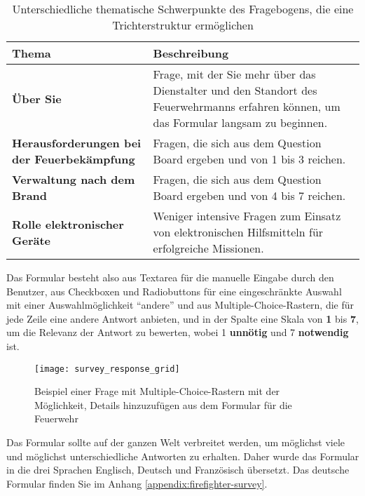\begin{table}[H]
  \begin{tabular}{p{0.4\linewidth} |p{0.6\linewidth}}
    Thema                                              & Beschreibung                                                                                                                           \\ \hline\hline

    \textbf{Über Sie}                                  & Frage, mit der Sie mehr über das Dienstalter und den Standort des Feuerwehrmanns erfahren können, um das Formular langsam zu beginnen. \\\hline
    \textbf{Herausforderungen bei der Feuerbekämpfung} & Fragen, die sich aus dem Question Board ergeben und von 1 bis 3 reichen.                                                               \\\hline
    \textbf{Verwaltung nach dem Brand}                 & Fragen, die sich aus dem Question Board ergeben und von 4 bis 7 reichen.                                                               \\\hline
    \textbf{Rolle elektronischer Geräte}               & Weniger intensive Fragen zum Einsatz von elektronischen Hilfsmitteln für erfolgreiche Missionen.
  \end{tabular}
  \caption{Unterschiedliche thematische Schwerpunkte des Fragebogens, die eine Trichterstruktur ermöglichen}
\end{table}

Das Formular besteht also aus Textarea für die manuelle Eingabe durch den Benutzer, aus Checkboxen und Radiobuttons für eine eingeschränkte Auswahl mit einer Auswahlmöglichkeit ``andere'' und aus Multiple-Choice-Rastern, die für jede Zeile eine andere Antwort anbieten, und in der Spalte eine Skala von \textbf{1} bis \textbf{7}, um die Relevanz der Antwort zu bewerten, wobei 1 \textbf{unnötig} und 7 \textbf{notwendig} ist.

\begin{figure}[H]
  \centering
  \texttt{[image: survey\_response\_grid]}
  \caption{Beispiel einer Frage mit Multiple-Choice-Rastern mit der Möglichkeit, Details hinzuzufügen aus dem Formular für die Feuerwehr}
  \label{fig:survey_response_grid}
\end{figure}

Das Formular sollte auf der ganzen Welt verbreitet werden, um möglichst viele und möglichst unterschiedliche Antworten zu erhalten.
Daher wurde das Formular in die drei Sprachen Englisch, Deutsch und Französisch übersetzt.
Das deutsche Formular finden Sie im Anhang \ref{appendix:firefighter-survey}.

